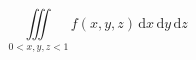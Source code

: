 \newcommand\diff{\,\mathrm{d}}
\[  \iiint\limits_{0<x,y,z<1} f(x,y,z)
  \diff x \diff y \diff z  \]
